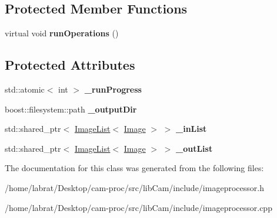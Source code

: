 \subsection*{Protected Member Functions}
\begin{DoxyCompactItemize}
\item 
virtual void {\bfseries run\+Operations} ()\hypertarget{classImageProcessor_a941a4522d877b3f8f5e60decc8b2aabc}{}\label{classImageProcessor_a941a4522d877b3f8f5e60decc8b2aabc}

\end{DoxyCompactItemize}
\subsection*{Protected Attributes}
\begin{DoxyCompactItemize}
\item 
std\+::atomic$<$ int $>$ {\bfseries \+\_\+run\+Progress}\hypertarget{classImageProcessor_af0a4507f08cb0d46059f0f27210189b6}{}\label{classImageProcessor_af0a4507f08cb0d46059f0f27210189b6}

\item 
boost\+::filesystem\+::path {\bfseries \+\_\+output\+Dir}\hypertarget{classImageProcessor_a86cd22b7774c324d198866412a711c91}{}\label{classImageProcessor_a86cd22b7774c324d198866412a711c91}

\item 
std\+::shared\+\_\+ptr$<$ \hyperlink{classImageList}{Image\+List}$<$ \hyperlink{classImage}{Image} $>$ $>$ {\bfseries \+\_\+in\+List}\hypertarget{classImageProcessor_a2dfb4670e08306f65988776cac511e2b}{}\label{classImageProcessor_a2dfb4670e08306f65988776cac511e2b}

\item 
std\+::shared\+\_\+ptr$<$ \hyperlink{classImageList}{Image\+List}$<$ \hyperlink{classImage}{Image} $>$ $>$ {\bfseries \+\_\+out\+List}\hypertarget{classImageProcessor_a31872eb7998b43058f4c678ba24d1d31}{}\label{classImageProcessor_a31872eb7998b43058f4c678ba24d1d31}

\end{DoxyCompactItemize}


The documentation for this class was generated from the following files\+:\begin{DoxyCompactItemize}
\item 
/home/labrat/\+Desktop/cam-\/proc/src/lib\+Cam/include/imageprocessor.\+h\item 
/home/labrat/\+Desktop/cam-\/proc/src/lib\+Cam/include/imageprocessor.\+cpp\end{DoxyCompactItemize}
